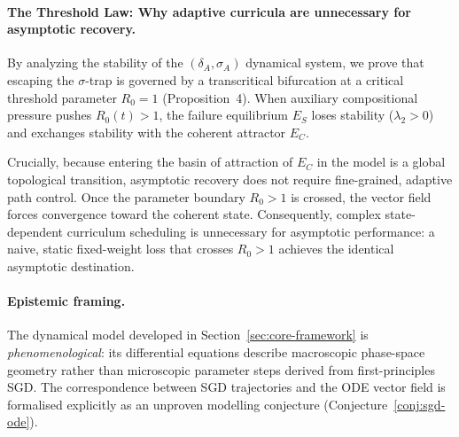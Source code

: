 \documentclass{article}
\theoremstyle{definition}
\begin{document}
\paragraph*{The Threshold Law: Why adaptive curricula are unnecessary for asymptotic recovery.}
By analyzing the stability of the $(\delta_A, \sigma_A)$ dynamical system, we prove that escaping the $\sigma$-trap is governed by a transcritical bifurcation at a critical threshold parameter $R_0 = 1$ (Proposition~4). When auxiliary compositional pressure pushes $R_0(t) > 1$, the failure equilibrium $E_S$ loses stability ($\lambda_2 > 0$) and exchanges stability with the coherent attractor $E_C$. 

Crucially, because entering the basin of attraction of $E_C$ in the model is a global topological transition, asymptotic recovery does not require fine-grained, adaptive path control. Once the parameter boundary $R_0 > 1$ is crossed, the vector field forces convergence toward the coherent state. Consequently, complex state-dependent curriculum scheduling is unnecessary for asymptotic performance: a naive, static fixed-weight loss that crosses $R_0 > 1$ achieves the identical asymptotic destination.

\paragraph*{Epistemic framing.}
The dynamical model developed in Section~\ref{sec:core-framework} is \emph{phenomenological}: its differential equations describe macroscopic phase-space geometry rather than microscopic parameter steps derived from first-principles SGD. The correspondence between SGD trajectories and the ODE vector field is formalised explicitly as an unproven modelling conjecture (Conjecture~\ref{conj:sgd-ode}).
\end{document}
